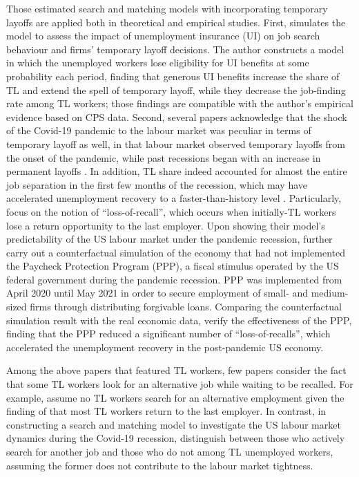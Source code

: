 \documentclass[a4paper, 11pt, tikz]{article}
\begin{document}
Those estimated search and matching models with incorporating temporary layoffs are applied both in theoretical and empirical studies.
First, \cite{komatsu2024temporary} simulates the model to assess the impact of unemployment insurance (UI) on job search behaviour and firms' temporary layoff decisions.
The author constructs a model in which the unemployed workers lose eligibility for UI benefits at some probability each period, finding that generous UI benefits increase the share of TL and extend the spell of temporary layoff, while they decrease the job-finding rate among TL workers; those findings are compatible with the author's empirical evidence based on CPS data.
Second, several papers acknowledge that the shock of the Covid-19 pandemic to the labour market was peculiar in terms of temporary layoff as well, in that labour market observed temporary layoffs from the onset of the pandemic, while past recessions began with an increase in permanent layoffs \citep{gallant2020temporary}.
In addition, TL share indeed accounted for almost the entire job separation in the first few months of the recession, which may have accelerated unemployment recovery to a faster-than-history level \citep{gallant2020temporary, hall2022unemployed}.
Particularly, \cite{gertler2022temporary} focus on the notion of ``loss-of-recall'', which occurs when initially-TL workers lose a return opportunity to the last employer.
Upon showing their model's predictability of the US labour market under the pandemic recession, \cite{gertler2022temporary} further carry out a counterfactual simulation of the economy that had not implemented the Paycheck Protection Program (PPP), a fiscal stimulus operated by the US federal government during the pandemic recession.
PPP was implemented from April 2020 until May 2021 in order to secure employment of small- and medium-sized firms through distributing forgivable loans.
Comparing the counterfactual simulation result with the real economic data, \cite{gertler2022temporary} verify the effectiveness of the PPP, finding that the PPP reduced a significant number of ``loss-of-recalls'', which accelerated the unemployment recovery in the post-pandemic US economy.

Among the above papers that featured TL workers, few papers consider the fact that some TL workers look for an alternative job while waiting to be recalled.
For example, \cite{gertler2022temporary} assume no TL workers search for an alternative employment given the finding of \cite{fujita2017recall} that most TL workers return to the last employer.
In contrast, in constructing a search and matching model to investigate the US labour market dynamics during the Covid-19 recession, \cite{gallant2020temporary} distinguish between those who actively search for another job and those who do not among TL unemployed workers, assuming the former does not contribute to the labour market tightness.
\end{document}
